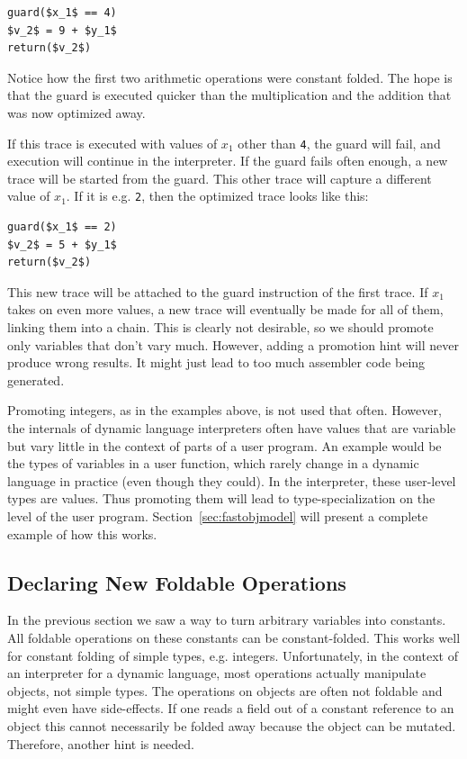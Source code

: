 \documentclass{sigplanconf}
\begin{document}
\begin{lstlisting}[mathescape,basicstyle=\ttfamily]
guard($x_1$ == 4)
$v_2$ = 9 + $y_1$
return($v_2$)
\end{lstlisting}

Notice how the first two arithmetic operations were constant folded. The hope is
that the guard is executed quicker than the multiplication and the addition that
was now optimized away.

If this trace is executed with values of $x_1$ other than \texttt{4}, the guard will
fail, and execution will continue in the interpreter. If the guard fails often
enough, a new trace will be started from the guard. This other trace will
capture a different value of $x_1$. If it is e.g. \texttt{2}, then the optimized
trace looks like this:

\begin{lstlisting}[mathescape,basicstyle=\ttfamily]
guard($x_1$ == 2)
$v_2$ = 5 + $y_1$
return($v_2$)
\end{lstlisting}

This new trace will be attached to the guard instruction of the first trace. If
$x_1$ takes on even more values, a new trace will eventually be made for all of them,
linking them into a chain. This is clearly not desirable, so we should promote
only variables that don't vary much. However, adding a promotion hint will never produce wrong
results. It might just lead to too much assembler code being generated.

Promoting integers, as in the examples above, is not used that often.
However, the internals of dynamic language interpreters often
have values that are variable but vary little in the context of parts of a user
program. An example would be the types of variables in a user function, which
rarely change in a dynamic language in practice (even though they could). In the
interpreter, these user-level types are values. Thus promoting them will lead
to type-specialization on the level of the user program.
Section~\ref{sec:fastobjmodel} will present a complete example of how this
works.


\subsection{Declaring New Foldable Operations}

In the previous section we saw a way to turn arbitrary variables into constants. All
foldable operations on these constants can be constant-folded. This works well for
constant folding of simple types, e.g. integers. Unfortunately, in the context of an
interpreter for a dynamic
language, most operations actually manipulate objects, not simple types. The
operations on objects are often not foldable and might even have side-effects. If
one reads a field out of a constant reference to an object this cannot
necessarily be folded away because the object can be mutated. Therefore, another
hint is needed.
\end{document}
